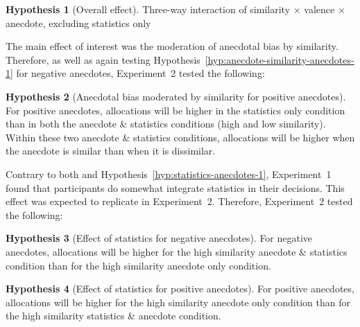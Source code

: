 \documentclass[a4paper, nobind, dvipsnames]{templates/ociamthesis}
\theoremstyle{definition}
\theoremstyle{definition}
\theoremstyle{definition}
\theoremstyle{definition}
\newtheorem{hypothesis}{Hypothesis}[chapter]
\theoremstyle{remark}
\begin{document}
\begin{hypothesis}[Overall effect]
\protect\hypertarget{hyp:three-way-anecdotes-2}{}{\label{hyp:three-way-anecdotes-2} {} }Three-way interaction of similarity \(\times\) valence \(\times\) anecdote,
excluding statistics only
\end{hypothesis}

The main effect of interest was the moderation of anecdotal bias by similarity.
Therefore, as well as again testing
Hypothesis~\ref{hyp:anecdote-similarity-anecdotes-1} for negative anecdotes,
Experiment~2 tested the following:

\begin{hypothesis}[Anecdotal bias moderated by similarity for positive anecdotes]
\protect\hypertarget{hyp:anecdote-similarity-anecdotes-2}{}{\label{hyp:anecdote-similarity-anecdotes-2} {} }For positive anecdotes, allocations will be higher in the statistics only
condition than in both the anecdote \& statistics conditions (high and low
similarity). Within these two anecdote \& statistics conditions, allocations will
be higher when the anecdote is similar than when it is dissimilar.
\end{hypothesis}

Contrary to both \textcite{wainberg2013} and Hypothesis~\ref{hyp:statistics-anecdotes-1},
Experiment~1 found that participants do somewhat integrate statistics in their
decisions. This effect was expected to replicate in Experiment~2. Therefore,
Experiment~2 tested the following:

\begin{hypothesis}[Effect of statistics for negative anecdotes]
\protect\hypertarget{hyp:statistics-negative-anecdotes-2}{}{\label{hyp:statistics-negative-anecdotes-2} {} }For negative anecdotes, allocations will be higher for the high similarity
anecdote \& statistics condition than for the high similarity anecdote only
condition.
\end{hypothesis}

\begin{hypothesis}[Effect of statistics for positive anecdotes]
\protect\hypertarget{hyp:statistics-positive-anecdotes-2}{}{\label{hyp:statistics-positive-anecdotes-2} {} }For positive anecdotes, allocations will be higher for the high similarity
anecdote only condition than for the high similarity statistics \& anecdote
condition.
\end{hypothesis}
\end{document}
